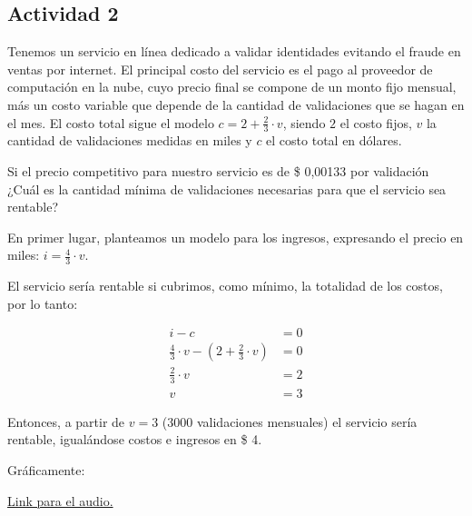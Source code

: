 \subsection*{Actividad 2}

Tenemos un servicio en línea dedicado a validar identidades evitando el fraude en ventas por internet. El principal costo del servicio es el pago al proveedor de computación en la nube, cuyo precio final se compone de un monto fijo mensual, más un costo variable que depende de la cantidad de validaciones que se hagan en el mes. El costo total sigue el modelo $c = 2 + \frac{2}{3} \cdot v$, siendo $2$ el costo fijos, $v$ la cantidad de validaciones medidas en miles y $c$ el costo total en dólares. 

Si el precio competitivo para nuestro servicio es de \$ 0,00133 por validación ¿Cuál es la cantidad mínima de validaciones necesarias para que el servicio sea rentable?

En primer lugar, planteamos un modelo para los ingresos, expresando el precio en miles: $i = \frac{4}{3} \cdot v$.

El servicio sería rentable si cubrimos, como mínimo, la totalidad de los costos, por lo tanto:

\begin{align*}
	i - c &= 0\\
    \frac{4}{3} \cdot v - \left(2 + \frac{2}{3} \cdot v \right) &= 0\\
    \frac{2}{3} \cdot v &= 2\\
    v &= 3
\end{align*}

Entonces, a partir de $v = 3$ (3000 validaciones mensuales) el servicio sería rentable, igualándose costos e ingresos en \$ 4.

Gráficamente:

\begin{center}
\end{center}

\href{https://drive.google.com/file/d/1DXpY7xukQlkF4CswWKmvItGMWZuxZohS/view?usp=sharing}{Link para el audio.}
